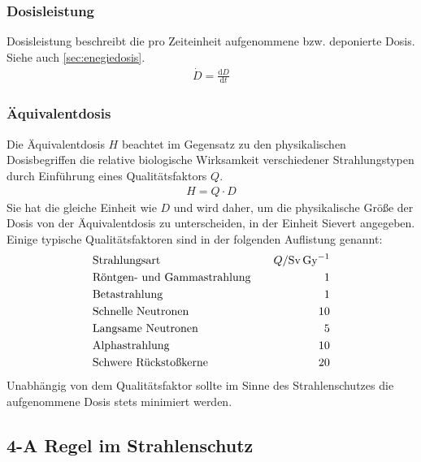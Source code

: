 \documentclass[11pt, a4paper]{article}
\numberwithin{equation}{section}
\begin{document}
\subsubsection{Dosisleistung}
Dosisleistung beschreibt die pro Zeiteinheit aufgenommene bzw. deponierte Dosis. Siehe auch \ref{sec:enegiedosis}.
\begin{align}
	\dot{D} = \frac{\mathrm{d}D}{\mathrm{d}t}
\end{align}

\subsubsection{Äquivalentdosis}
Die Äquivalentdosis $H$ beachtet im Gegensatz zu den physikalischen Dosisbegriffen die relative biologische Wirksamkeit verschiedener Strahlungstypen durch Einführung eines Qualitätsfaktors $Q$.
\begin{align}
	H = Q \cdot D
\end{align}
Sie hat die gleiche Einheit wie $D$ und wird daher, um die physikalische Größe der Dosis von der Äquivalentdosis zu unterscheiden, in der Einheit Sievert angegeben.
Einige typische Qualitätsfaktoren sind in der folgenden Auflistung genannt\cite{gerthsen}:
\begin{align*}
	&\text{Strahlungsart} \quad & Q / \si{Sv.Gy\tothe{-1}}\\
	&\text{Röntgen- und Gammastrahlung} \quad & 1 \\
	&\text{Betastrahlung} \quad & 1 \\
	&\text{Schnelle Neutronen} \quad & 10 \\
	&\text{Langsame Neutronen} \quad & 5 \\
	&\text{Alphastrahlung} \quad & 10 \\
	&\text{Schwere Rückstoßkerne} \quad & 20
\end{align*}
Unabhängig von dem Qualitätsfaktor sollte im Sinne des Strahlenschutzes die aufgenommene Dosis stets minimiert werden. 

\subsection{4-A Regel im Strahlenschutz}
\end{document}
